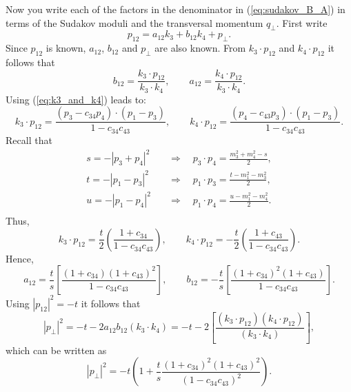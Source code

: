 Now you write each of the factors in the denominator in (\ref{eq:sudakov_B_A}) in terms of the Sudakov moduli and the transversal momentum $q_{\perp}$. First write
\begin{equation}
	p_{12} = a_{12} k_{3} + b_{12} k_{4} + p_{\perp}.
\end{equation}
Since $p_{12}$ is known, $a_{12}$, $b_{12}$ and $p_{\perp}$ are also known. From $k_{3} \cdot p_{12}$ and $k_{4} \cdot p_{12}$ it follows that
\begin{equation}
	b_{12} = \frac{k_{3} \cdot p_{12}}{k_{3} \cdot k_{4}}, \qquad a_{12} = \frac{k_{4} \cdot p_{12}}{k_{3} \cdot k_{4}}.
\end{equation}
Using (\ref{eq:k3_and_k4}) leads to:
\begin{equation}
	k_{3} \cdot p_{12} = \frac{(p_{3} - c_{34} p_{4}) \cdot (p_{1} - p_{3})}{1 - c_{34} c_{43}}, \qquad k_{4} \cdot p_{12} = \frac{(p_{4} - c_{43} p_{3}) \cdot (p_{1} - p_{3})}{1 - c_{34} c_{43}}.
\end{equation}
Recall that
\begin{align}
	s = -| p_{3} + p_{4} |^{2} \quad &\Rightarrow \quad p_{3} \cdot p_{4} = \frac{m_{3}^{2} + m_{4}^{2} - s}{2}, \\
	t = -| p_{1} - p_{3} |^{2} \quad &\Rightarrow \quad p_{1} \cdot p_{3} = \frac{t - m_{1}^{2} - m_{3}^{2}}{2}, \\
	u = -| p_{1} - p_{4} |^{2} \quad &\Rightarrow \quad p_{1} \cdot p_{4} = \frac{u - m_{1}^{2} - m_{4}^{2}}{2}. \\
\end{align}
Thus,
\begin{equation}
	k_{3} \cdot p_{12} = \frac{t}{2} \left( \frac{1 + c_{34}}{1 - c_{34} c_{43}} \right), \qquad k_{4} \cdot p_{12} = -\frac{t}{2} \left( \frac{1 + c_{43}}{1 - c_{34} c_{43}} \right).
\end{equation}
Hence,
\begin{equation}
	a_{12} = \frac{t}{s} \left[ \frac{(1 + c_{34}) (1 + c_{43})^{2}}{1 - c_{34} c_{43}} \right], \qquad b_{12} = -\frac{t}{s} \left[ \frac{(1 + c_{34})^{2} (1 + c_{43})}{1 - c_{34} c_{43}} \right].
\end{equation}
Using $|p_{12}|^{2} = -t$ it follows that
\begin{equation}
	|p_{\perp}|^{2} = -t - 2 a_{12} b_{12} (k_{3} \cdot k_{4}) = -t - 2 \left[ \frac{(k_{3} \cdot p_{12}) (k_{4} \cdot p_{12})}{(k_{3} \cdot k_{4})} \right],
\end{equation}
which can be written as
\begin{equation}
	|p_{\perp}|^{2} = -t \left( 1 + \frac{t}{s} \frac{(1 + c_{34})^{2}(1 + c_{43})^{2}}{(1 - c_{34} c_{43})^{2}} \right).
\end{equation}
